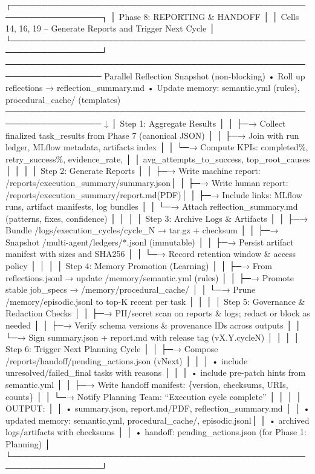 \documentclass[
]{article}
\begin{document}
┌─────────────────────────────────────────────────────────────────┐ │
Phase 8: REPORTING \& HANDOFF │ │ Cells 14, 16, 19 -- Generate Reports
and Trigger Next Cycle │
└─────────────────────────────────────────────────────────────────┘
──────────────────────────────────────────────────────────────────
Parallel Reflection Snapshot (non-blocking) • Roll up reflections →
reflection\_summary.md • Update memory: semantic.yml (rules),
procedural\_cache/ (templates)
────────────────────────────────────────────────────────────────── ↓ │
Step 1: Aggregate Results │ │ ├─→ Collect finalized task\_results from
Phase 7 (canonical JSON) │ │ ├─→ Join with run ledger, MLflow metadata,
artifacts index │ │ └─→ Compute KPIs: completed\%, retry\_success\%,
evidence\_rate, │ │ avg\_attempts\_to\_success, top\_root\_causes │ │ │
│ Step 2: Generate Reports │ │ ├─→ Write machine report:
/reports/execution\_summary/summary.json│ │ ├─→ Write human report:
/reports/execution\_summary/report.md(PDF)│ │ ├─→ Include links: MLflow
runs, artifact manifests, log bundles │ │ └─→ Attach
reflection\_summary.md (patterns, fixes, confidence) │ │ │ │ Step 3:
Archive Logs \& Artifacts │ │ ├─→ Bundle
/logs/execution\_cycles/cycle\_N → tar.gz + checksum │ │ ├─→ Snapshot
/multi-agent/ledgers/*.jsonl (immutable) │ │ ├─→ Persist artifact
manifest with sizes and SHA256 │ │ └─→ Record retention window \& access
policy │ │ │ │ Step 4: Memory Promotion (Learning) │ │ ├─→ From
reflections.jsonl → update /memory/semantic.yml (rules) │ │ ├─→ Promote
stable job\_specs → /memory/procedural\_cache/ │ │ └─→ Prune
/memory/episodic.jsonl to top-K recent per task │ │ │ │ Step 5:
Governance \& Redaction Checks │ │ ├─→ PII/secret scan on reports \&
logs; redact or block as needed │ │ ├─→ Verify schema versions \&
provenance IDs across outputs │ │ └─→ Sign summary.json + report.md with
release tag (vX.Y.cycleN) │ │ │ │ Step 6: Trigger Next Planning Cycle │
│ ├─→ Compose /reports/handoff/pending\_actions.json (vNext) │ │ │ •
include unresolved/failed\_final tasks with reasons │ │ │ • include
pre-patch hints from semantic.yml │ │ ├─→ Write handoff manifest:
\{version, checksums, URIs, counts\} │ │ └─→ Notify Planning Team:
``Execution cycle complete'' │ │ │ │ OUTPUT: │ │ • summary.json,
report.md/PDF, reflection\_summary.md │ │ • updated memory:
semantic.yml, procedural\_cache/, episodic.jsonl│ │ • archived
logs/artifacts with checksums │ │ • handoff: pending\_actions.json (for
Phase 1: Planning) │
└─────────────────────────────────────────────────────────────────┘
\end{document}

